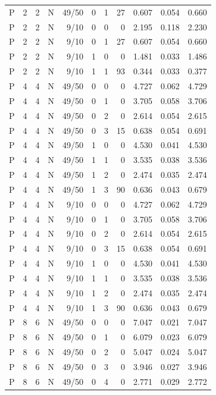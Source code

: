 \begin{longtable}{rrrrrrrrrrr}
P & 2 & 2 & N & 49/50 & 0 & 1 & 27 & 0.607 & 0.054 & 0.660 \\
P & 2 & 2 & N & 9/10 & 0 & 0 & 0 & 2.195 & 0.118 & 2.230 \\
P & 2 & 2 & N & 9/10 & 0 & 1 & 27 & 0.607 & 0.054 & 0.660 \\
P & 2 & 2 & N & 9/10 & 1 & 0 & 0 & 1.481 & 0.033 & 1.486 \\
P & 2 & 2 & N & 9/10 & 1 & 1 & 93 & 0.344 & 0.033 & 0.377 \\
P & 4 & 4 & N & 49/50 & 0 & 0 & 0 & 4.727 & 0.062 & 4.729 \\
P & 4 & 4 & N & 49/50 & 0 & 1 & 0 & 3.705 & 0.058 & 3.706 \\
P & 4 & 4 & N & 49/50 & 0 & 2 & 0 & 2.614 & 0.054 & 2.615 \\
P & 4 & 4 & N & 49/50 & 0 & 3 & 15 & 0.638 & 0.054 & 0.691 \\
P & 4 & 4 & N & 49/50 & 1 & 0 & 0 & 4.530 & 0.041 & 4.530 \\
P & 4 & 4 & N & 49/50 & 1 & 1 & 0 & 3.535 & 0.038 & 3.536 \\
P & 4 & 4 & N & 49/50 & 1 & 2 & 0 & 2.474 & 0.035 & 2.474 \\
P & 4 & 4 & N & 49/50 & 1 & 3 & 90 & 0.636 & 0.043 & 0.679 \\
P & 4 & 4 & N & 9/10 & 0 & 0 & 0 & 4.727 & 0.062 & 4.729 \\
P & 4 & 4 & N & 9/10 & 0 & 1 & 0 & 3.705 & 0.058 & 3.706 \\
P & 4 & 4 & N & 9/10 & 0 & 2 & 0 & 2.614 & 0.054 & 2.615 \\
P & 4 & 4 & N & 9/10 & 0 & 3 & 15 & 0.638 & 0.054 & 0.691 \\
P & 4 & 4 & N & 9/10 & 1 & 0 & 0 & 4.530 & 0.041 & 4.530 \\
P & 4 & 4 & N & 9/10 & 1 & 1 & 0 & 3.535 & 0.038 & 3.536 \\
P & 4 & 4 & N & 9/10 & 1 & 2 & 0 & 2.474 & 0.035 & 2.474 \\
P & 4 & 4 & N & 9/10 & 1 & 3 & 90 & 0.636 & 0.043 & 0.679 \\
P & 8 & 6 & N & 49/50 & 0 & 0 & 0 & 7.047 & 0.021 & 7.047 \\
P & 8 & 6 & N & 49/50 & 0 & 1 & 0 & 6.079 & 0.023 & 6.079 \\
P & 8 & 6 & N & 49/50 & 0 & 2 & 0 & 5.047 & 0.024 & 5.047 \\
P & 8 & 6 & N & 49/50 & 0 & 3 & 0 & 3.946 & 0.027 & 3.946 \\
P & 8 & 6 & N & 49/50 & 0 & 4 & 0 & 2.771 & 0.029 & 2.772 \\

\end{longtable}
